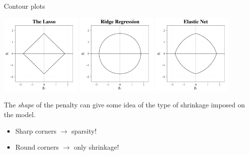 \documentclass[8pt]{beamer}
\begin{document}
\begin{frame}{\color{white} Contour plots}

\begin{center}
    \centering
    \includegraphics[width = 0.3\textwidth]{cont_lasso.pdf}
    \includegraphics[width = 0.3\textwidth]{cont_ridge.pdf}
    \includegraphics[width = 0.3\textwidth]{cont_enet.pdf}
\end{center}

The \textit{shape} of the penalty can give some idea of the type of shrinkage imposed on the model.
\begin{itemize}
    \item Sharp corners $\to$ sparsity! \Laughey[1.5][yellow][pink]
    \item Round corners $\to$ only shrinkage!
\end{itemize}
    
\end{frame}
\end{document}
